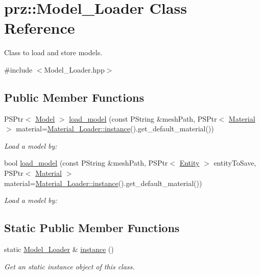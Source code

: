 \hypertarget{classprz_1_1_model___loader}{}\section{prz\+::Model\+\_\+\+Loader Class Reference}
\label{classprz_1_1_model___loader}


Class to load and store models.  




{\ttfamily \#include $<$Model\+\_\+\+Loader.\+hpp$>$}

\subsection*{Public Member Functions}
\begin{DoxyCompactItemize}
\item 
P\+S\+Ptr$<$ \mbox{\hyperlink{classprz_1_1_model}{Model}} $>$ \mbox{\hyperlink{classprz_1_1_model___loader_a3a71609e728a26ec26b4b5da165f9b09}{load\+\_\+model}} (const P\+String \&mesh\+Path, P\+S\+Ptr$<$ \mbox{\hyperlink{classprz_1_1_material}{Material}} $>$ material=\mbox{\hyperlink{classprz_1_1_material___loader_a5fa3903db95525602037c029debb6532}{Material\+\_\+\+Loader\+::instance}}().get\+\_\+default\+\_\+material())
\begin{DoxyCompactList}\small\item\em Load a model by\+: \end{DoxyCompactList}\item 
bool \mbox{\hyperlink{classprz_1_1_model___loader_a7edc6d5fa1e3d13e965045199c9ec933}{load\+\_\+model}} (const P\+String \&mesh\+Path, P\+S\+Ptr$<$ \mbox{\hyperlink{classprz_1_1_entity}{Entity}} $>$ entity\+To\+Save, P\+S\+Ptr$<$ \mbox{\hyperlink{classprz_1_1_material}{Material}} $>$ material=\mbox{\hyperlink{classprz_1_1_material___loader_a5fa3903db95525602037c029debb6532}{Material\+\_\+\+Loader\+::instance}}().get\+\_\+default\+\_\+material())
\begin{DoxyCompactList}\small\item\em Load a model by\+: \end{DoxyCompactList}\end{DoxyCompactItemize}
\subsection*{Static Public Member Functions}
\begin{DoxyCompactItemize}
\item 
static \mbox{\hyperlink{classprz_1_1_model___loader}{Model\+\_\+\+Loader}} \& \mbox{\hyperlink{classprz_1_1_model___loader_a377fe640a549451ac04cffff0cf8c0d9}{instance}} ()
\begin{DoxyCompactList}\small\item\em Get an static instance object of this class. \end{DoxyCompactList}\end{DoxyCompactItemize}


